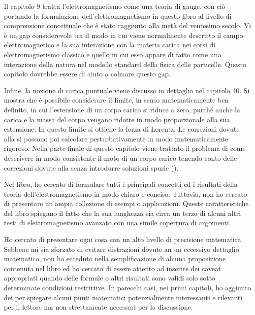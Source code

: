 Il capitolo 9 tratta l'elettromagnetismo come una teoria di gauge, con ciò portando la formulazione dell'elettromagnetismo in questo libro al livello di comprensione concettuale che è stato raggiunto alla metà del ventesimo secolo. Vi è un gap considerevole tra il modo in cui viene normalmente descritto il campo elettromagnetico e la sua interazione con la materia carica nei corsi di elettromagnetismo classico e quello in cui esso appare di fatto come una interazione della natura nel modello standard della fisica delle particelle. Questo capitolo dovrebbe essere di aiuto a colmare questo gap.    

Infine, la nozione di carica puntuale viene discusso in dettaglio nel capitolo 10. Si mostra che è possibile considerare il limite, in senso matematicamente ben definito, in cui l'estensione di un corpo carico si riduce a zero, purché anche la carica e la massa del corpo vengano ridotte in modo proporzionale alla sua estensione. In questo limite si ottiene la forza di Lorentz. Le correzioni dovute alla  si possono poi calcolare perturbativamente in modo matematicamente rigoroso. Nella parte finale di questo capitolo viene trattato il problema di come descrivere in modo consistente il moto di un corpo carico tenendo conto delle correzioni dovute alla  senza introdurre soluzioni spurie ().

Nel libro, ho cercato di formulare tutti i principali concetti ed i risultati della teoria dell'elettromagnetismo in modo chiaro e conciso. Tuttavia, non ho cercato di presentare un'ampia collezione di esempi o applicazioni. Queste caratteristiche del libro spiegano il fatto che la sua lunghezza sia circa un terzo di alcuni altri testi di elettromagnetismo avanzato con una simile copertura di argomenti. 

Ho cercato di presentare ogni cosa con un alto livello di precisione matematica. Sebbene mi sia sforzato di evitare distrazioni dovute an un eccessivo dettaglio matematico, non ho ecceduto nella semplificazione di alcuna proposizione contenuta nel libro ed ho cercato di essere attento ad inserire dei caveat appropriati quando delle formule o altri risultati sono validi solo sotto determinate condizioni restrittive. In parecchi casi, nei primi capitoli, ho aggiunto dei  per spiegare alcuni punti matematici potenzialmente interessanti e rilevanti per il lettore ma non strettamente necessari per la discussione.

